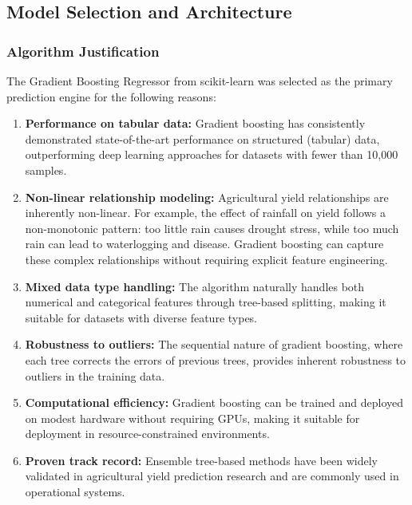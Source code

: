 \subsection{Model Selection and Architecture}

\subsubsection{Algorithm Justification}

The Gradient Boosting Regressor from scikit-learn was selected as the primary prediction engine for the following reasons:

\begin{enumerate}
  \item \textbf{Performance on tabular data:} Gradient boosting has consistently demonstrated state-of-the-art performance on structured (tabular) data, outperforming deep learning approaches for datasets with fewer than 10,000 samples.
  
  \item \textbf{Non-linear relationship modeling:} Agricultural yield relationships are inherently non-linear. For example, the effect of rainfall on yield follows a non-monotonic pattern: too little rain causes drought stress, while too much rain can lead to waterlogging and disease. Gradient boosting can capture these complex relationships without requiring explicit feature engineering.
  
  \item \textbf{Mixed data type handling:} The algorithm naturally handles both numerical and categorical features through tree-based splitting, making it suitable for datasets with diverse feature types.
  
  \item \textbf{Robustness to outliers:} The sequential nature of gradient boosting, where each tree corrects the errors of previous trees, provides inherent robustness to outliers in the training data.
  
  \item \textbf{Computational efficiency:} Gradient boosting can be trained and deployed on modest hardware without requiring GPUs, making it suitable for deployment in resource-constrained environments.
  
  \item \textbf{Proven track record:} Ensemble tree-based methods have been widely validated in agricultural yield prediction research and are commonly used in operational systems.
\end{enumerate}


